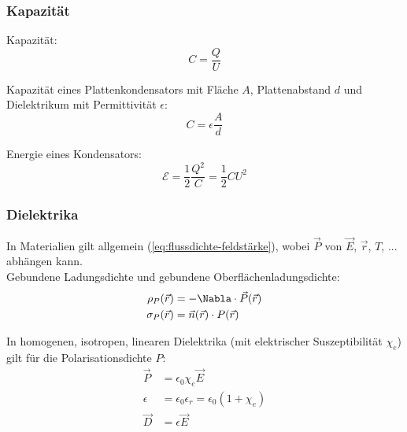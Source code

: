 \documentclass[11pt]{article}
\numberwithin{equation}{section}
\begin{document}
      \subsubsection{Kapazität}
        Kapazität:
        \begin{equation}
          C=\frac{Q}{U}
        \end{equation}

        Kapazität eines Plattenkondensators mit Fläche $A$, Plattenabstand $d$ und Dielektrikum mit Permittivität $\epsilon$:
        \begin{equation}
          C=\epsilon \frac{A}{d}
        \end{equation}

        Energie eines Kondensators:
        \begin{equation}
          \mathcal{E} = \frac{1}{2}\frac{Q^2}{C} = \frac{1}{2}CU^2
        \end{equation}

      \subsubsection{Dielektrika}
        In Materialien gilt allgemein (\ref{eq:flussdichte-feldstärke}), wobei $\vec{P}$ von $\vec{E}$, $\vec{r}$, $T$, ... abhängen kann. \\

        Gebundene Ladungsdichte und gebundene Oberflächenladungsdichte:
        \begin{equation}
          \begin{aligned}
            \rho_P(\vec{r}) &= -\Nabla \cdot\vec{P}(\vec{r}) \\
            \sigma_P(\vec{r}) &= \vec{n}(\vec{r})\cdot P(\vec{r})
          \end{aligned}
        \end{equation}

        In homogenen, isotropen, linearen Dielektrika (mit elektrischer Suszeptibilität $\chi_e$) gilt für die Polarisationsdichte $P$:
        \begin{equation}
          \begin{aligned}
            \vec{P} &= \epsilon_0 \chi_e \vec{E} \\
            \epsilon &= \epsilon_0 \epsilon_r = \epsilon_0(1+\chi_e) \\
            \vec{D} &= \epsilon \vec{E} \\
          \end{aligned}
        \end{equation}
\end{document}
